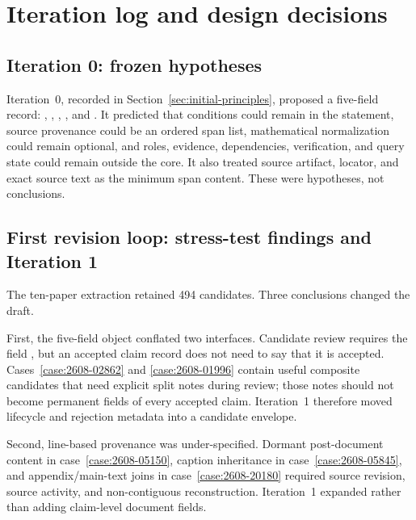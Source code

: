\section{Iteration log and design decisions}\label{sec:iteration-log}

\subsection{Iteration 0: frozen hypotheses}

\begin{sloppypar}
Iteration~0, recorded in Section~\ref{sec:initial-principles}, proposed a five-field record: , , , , and . It predicted that conditions could remain in the statement, source provenance could be an ordered span list, mathematical normalization could remain optional, and roles, evidence, dependencies, verification, and query state could remain outside the core. It also treated source artifact, locator, and exact source text as the minimum span content. These were hypotheses, not conclusions.
\end{sloppypar}

\subsection{First revision loop: stress-test findings and Iteration 1}

The ten-paper extraction retained 494 candidates. Three conclusions changed the draft.

First, the five-field object conflated two interfaces. Candidate review requires the field , but an accepted claim record does not need to say that it is accepted. Cases~\ref{case:2608-02862} and \ref{case:2608-01996} contain useful composite candidates that need explicit split notes during review; those notes should not become permanent fields of every accepted claim. Iteration~1 therefore moved lifecycle and rejection metadata into a candidate envelope.

Second, line-based provenance was under-specified. Dormant post-document content in case~\ref{case:2608-05150}, caption inheritance in case~\ref{case:2608-05845}, and appendix/main-text joins in case~\ref{case:2608-20180} required source revision, source activity, and non-contiguous reconstruction. Iteration~1 expanded \SourceSpan{} rather than adding claim-level document fields.

